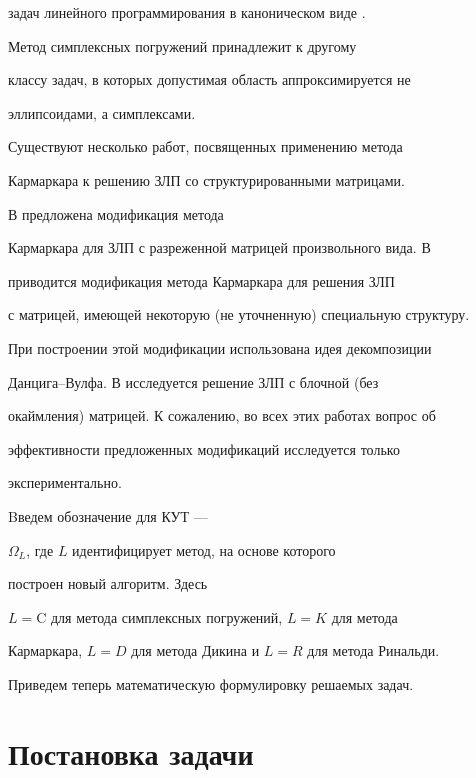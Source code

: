 задач линейного программирования в каноническом виде \cite{Berns}.





Метод симплексных погружений \cite{Antsif} принадлежит к другому


классу задач, в которых допустимая область аппроксимируется не


эллипсоидами, а симплексами.





Существуют несколько работ, посвященных применению метода


Кармаркара к решению ЗЛП со структурированными матрицами.


В \cite{Fujisawa} предложена модификация метода


Кармаркара для ЗЛП с разреженной матрицей произвольного вида. В


\cite{Todd} приводится модификация метода Кармаркара для решения ЗЛП


с матрицей, имеющей некоторую (не уточненную) специальную структуру.


При построении этой модификации использована идея декомпозиции


Данцига--Вулфа. В \cite{Choi} исследуется решение ЗЛП с блочной (без


окаймления) матрицей. К сожалению, во всех этих работах вопрос об


эффективности предложенных модификаций исследуется только


экспериментально.





Bведем обозначение для КУТ ---


$\Omega_L$, где $L$ идентифицирует метод, на основе которого


построен новый алгоритм. Здесь


$L=\mathrm C$ для метода симплексных погружений, $L=K$ для метода


Кармаркара, $L=D$ для метода Дикина и $L=R$ для метода Ринальди.





Приведем теперь математическую формулировку решаемых задач.





\section{Постановка задачи}





